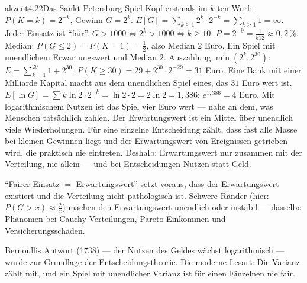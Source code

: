 \begin{loesungkarte}{akzent}{4.22}{Das Sankt-Petersburg-Spiel}
Kopf erstmals im $k$-ten Wurf: $P(K = k) = 2^{-k}$, Gewinn $G = 2^{k}$. $E[G] = \sum_{k\ge1}2^{k}\cdot2^{-k} = \sum_{k\ge1}1 = \infty$. Jeder Einsatz ist \enquote{fair}.
$G > 1000\iff2^{k} > 1000\iff k\ge10$: $P = 2^{-9} = \frac1{512}\approx0{,}2\,\%$. Median: $P(G\le2) = P(K = 1) = \frac12$, also Median $2$ Euro. Ein Spiel mit unendlichem Erwartungswert und Median $2$.
Auszahlung $\min(2^{k}, 2^{30})$: $E = \sum_{k=1}^{29}1 + 2^{30}\cdot P(K\ge30) = 29 + 2^{30}\cdot2^{-29} = 31$ Euro. Eine Bank mit einer Milliarde Kapital macht aus dem unendlichen Spiel eines, das $31$ Euro wert ist.
$E[\ln G] = \sum k\ln2\cdot2^{-k} = \ln2\cdot2 = 2\ln2 = 1{,}386$; $e^{1{,}386} = 4$ Euro. Mit logarithmischem Nutzen ist das Spiel vier Euro wert --- nahe an dem, was Menschen tatsächlich zahlen.
Der Erwartungswert ist ein Mittel über unendlich viele Wiederholungen. Für eine einzelne Entscheidung zählt, dass fast alle Masse bei kleinen Gewinnen liegt und der Erwartungswert von Ereignissen getrieben wird, die praktisch nie eintreten. Deshalb: Erwartungswert nur zusammen mit der Verteilung, nie allein --- und bei Entscheidungen Nutzen statt Geld.
\begin{fehler}\kastentext
\enquote{Fairer Einsatz $=$ Erwartungswert} setzt voraus, dass der Erwartungswert existiert und die Verteilung nicht pathologisch ist. Schwere Ränder (hier: $P(G > x)\approx\frac2x$) machen den Erwartungswert unendlich oder instabil --- dasselbe Phänomen bei Cauchy-Verteilungen, Pareto-Einkommen und Versicherungsschäden.
\end{fehler}
\begin{mitnehmen}\kastentext
Bernoullis Antwort (1738) --- der Nutzen des Geldes wächst logarithmisch --- wurde zur Grundlage der Entscheidungstheorie. Die moderne Lesart: Die Varianz zählt mit, und ein Spiel mit unendlicher Varianz ist für einen Einzelnen nie fair.
\end{mitnehmen}
\end{loesungkarte}

